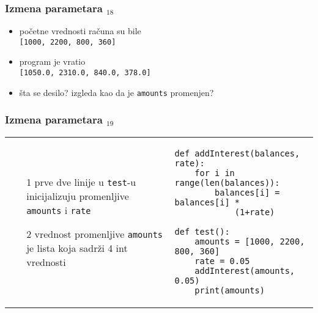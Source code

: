 \documentclass[utf8,compress,aspectratio=169]{beamer}
\begin{document}
\begin{frame}[fragile]
  \frametitle{Izmena parametara $_{18}$}
  \begin{itemize}
    \item početne vrednosti računa su bile \\
      \texttt{[1000, 2200, 800, 360]}
    \item program je vratio \\
      \texttt{[1050.0, 2310.0, 840.0, 378.0]}
    \item šta se desilo? izgleda kao da je \texttt{amounts} promenjen?
  \end{itemize}
\end{frame}

\begin{frame}[fragile,shrink=10]
  \frametitle{Izmena parametara $_{19}$}
\begin{tabular}{p{4cm}p{8cm}}
  \begin{itemize}
    \item[1] prve dve linije u \texttt{test}-u inicijalizuju promenljive \texttt{amounts} i \texttt{rate}
    \item[2] vrednost promenljive \texttt{amounts} je lista koja sadrži 4 int vrednosti
  \end{itemize}
&
\begin{verbatim}
def addInterest(balances, rate):
    for i in range(len(balances)):
        balances[i] = balances[i] *
            (1+rate)

def test():
    amounts = [1000, 2200, 800, 360]
    rate = 0.05
    addInterest(amounts, 0.05)
    print(amounts)
\end{verbatim}
\end{tabular}
\end{frame}
\end{document}

